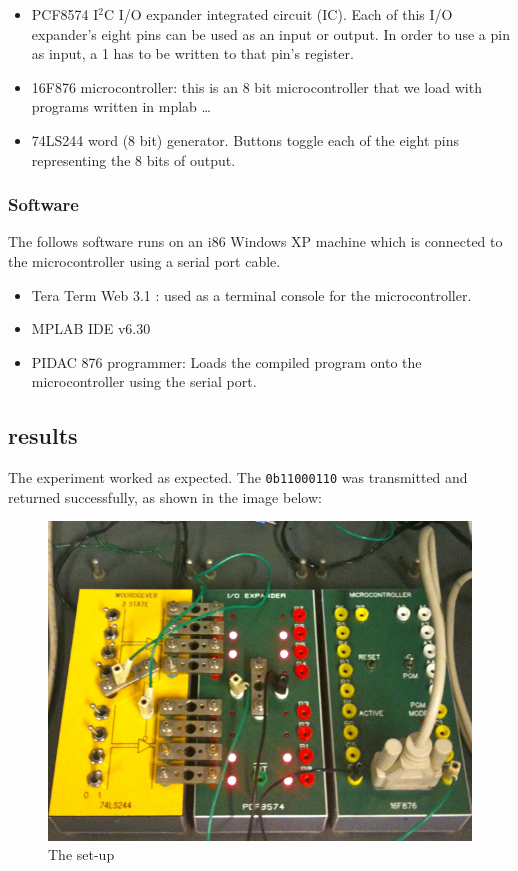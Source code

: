 \documentclass[a4paper, 12pt, titlepage]{article}
\begin{document}
\begin{itemize}
\item PCF8574 I$^2$C I/O expander integrated circuit (IC).
Each of this I/O expander's eight pins can be used as an input or output. In order 
to use a pin as input, a 1 has to be written to that pin's register.
\item 16F876 microcontroller: this is an 8 bit microcontroller that we load with
programs written in mplab \dots
\item 74LS244 word (8 bit) generator. Buttons toggle each of the eight pins
representing the 8 bits of output.
\end{itemize}

\subsubsection{Software}
The follows software runs on an i86 Windows XP machine which is connected to the
microcontroller using a serial port cable.
\begin{itemize}
\item Tera Term Web 3.1 : used as a terminal console for the microcontroller.
\item MPLAB IDE v6.30
\item PIDAC 876 programmer: Loads the compiled program onto the microcontroller
using the serial port.
\end{itemize}



\subsection{results} %
The experiment worked as expected. The \texttt{0b11000110} was transmitted and
returned successfully, as shown in the image below:
\begin{figure}[H]
\caption{The set-up}
\includegraphics[scale=0.61]{IMG_0703}
\end{figure}
\end{document}
